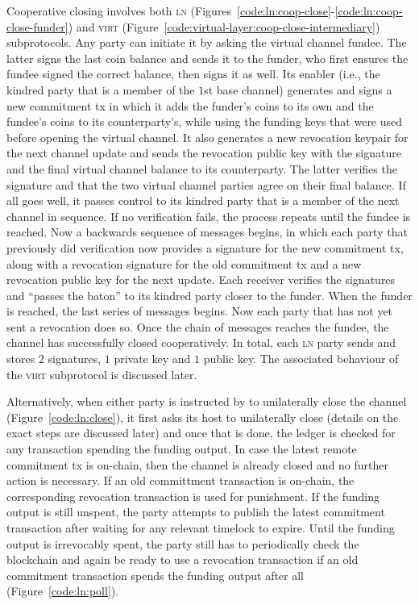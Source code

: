   Cooperative closing involves both \textsc{ln}
  (Figures~\ref{code:ln:coop-close}-\ref{code:ln:coop-close-funder}) and
  \textsc{virt} (Figure~\ref{code:virtual-layer:coop-close-intermediary})
  subprotocols. Any party can initiate it by asking the virtual channel fundee.
  The latter signs the last coin balance and sends it to the funder, who first
  ensures the fundee signed the correct balance, then signs it as well. Its
  enabler (i.e., the kindred party that is a member of the $1$st base channel)
  generates and signs a new commitment tx in which it adds the funder's coins to
  its own and the fundee's coins to its counterparty's, while using the funding
  keys that were used before opening the virtual channel. It also generates a
  new revocation keypair for the next channel update and sends the revocation
  public key with the signature and the final virtual channel balance to its
  counterparty. The latter verifies the signature and that the two virtual
  channel parties agree on their final balance. If all goes well, it passes
  control to its kindred party that is a member of the next channel in sequence.
  If no verification fails, the process repeats until the fundee is reached. Now
  a backwards sequence of messages begins, in which each party that previously
  did verification now provides a signature for the new commitment tx, along
  with a revocation signature for the old commitment tx and a new revocation
  public key for the next update. Each receiver verifies the signatures and
  ``passes the baton'' to its kindred party closer to the funder. When the
  funder is reached, the last series of messages begins. Now each party that has
  not yet sent a revocation does so. Once the chain of messages reaches the
  fundee, the channel has successfully closed cooperatively. In total, each
  \textsc{ln} party sends and stores $2$ signatures, $1$ private key and $1$
  public key. The associated behaviour of the \textsc{virt} subprotocol is
  discussed later.

  Alternatively, when either party is instructed by \environment to unilaterally close the
  channel (Figure~\ref{code:ln:close}), it first asks its host to unilaterally
  close (details on the exact steps are discussed later) and once that is done,
  the ledger is checked for any transaction spending the funding output. In case
  the latest remote commitment tx is on-chain, then the channel is already
  closed and no further action is necessary. If an old committment transaction
  is on-chain, the corresponding revocation transaction is used for punishment.
  If the funding output is still unspent, the party attempts to publish the
  latest commitment transaction after waiting for any relevant timelock to
  expire. Until the funding output is irrevocably spent, the party still has to
  periodically check the blockchain and again be ready to use a revocation
  transaction if an old commitment transaction spends the funding output after
  all (Figure~\ref{code:ln:poll}).

